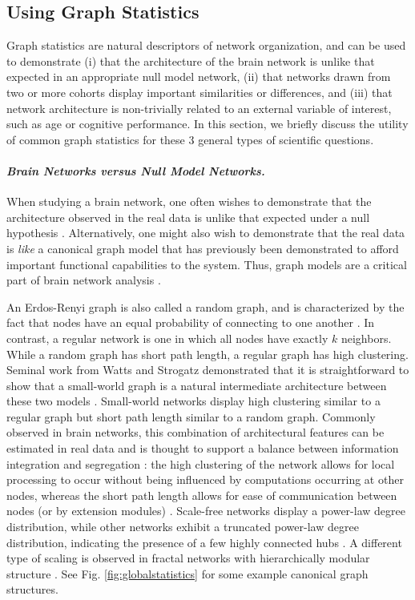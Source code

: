 \documentclass[12pt]{article}
\begin{document}
\subsection*{Using Graph Statistics}

Graph statistics are natural descriptors of network organization, and can be used to demonstrate (i) that the architecture of the brain network is unlike that expected in an appropriate null model network, (ii) that networks drawn from two or more cohorts display important similarities or differences, and (iii) that network architecture is non-trivially related to an external variable of interest, such as age or cognitive performance. In this section, we briefly discuss the utility of common graph statistics for these 3 general types of scientific questions.


\paragraph{\emph{Brain Networks \emph{versus} Null Model Networks.}}

When studying a brain network, one often wishes to demonstrate that the architecture observed in the real data is unlike that expected under a null hypothesis \cite{Bassett2011c,Bassett2012b}. Alternatively, one might also wish to demonstrate that the real data is \emph{like} a canonical graph model that has previously been demonstrated to afford important functional capabilities to the system. Thus, graph models are a critical part of brain network analysis \cite{Higham2008,Milenkovic2009,Rybarsch2012,Thorne2007,Kose2007}. 

An Erdos-Renyi graph is also called a random graph, and is characterized by the fact that nodes have an equal probability of connecting to one another \cite{Bollobas2001}. In contrast, a regular network is one in which all nodes have exactly $k$ neighbors. While a random graph has short path length, a regular graph has high clustering. Seminal work from Watts and Strogatz demonstrated that it is straightforward to show that a small-world graph is a natural intermediate architecture between these two models \cite{watts1998}. Small-world networks display high clustering similar to a regular graph but short path length similar to a random graph. Commonly observed in brain networks, this combination of architectural features can be estimated in real data \cite{muldoon2016small} and is thought to support a balance between information integration and segregation \cite{bassett2006small,bassett2016small}: the high clustering of the network allows for local processing to occur without being influenced by computations occurring at other nodes, whereas the short path length allows for ease of communication between nodes (or by extension modules) \cite{Stam2014}. Scale-free networks display a power-law degree distribution, while other networks exhibit a truncated power-law degree distribution, indicating the presence of a few highly connected hubs \cite{barabasi1999}. A different type of scaling is observed in fractal networks with hierarchically modular structure \cite{Sporns2006}. See Fig. \ref{fig:globalstatistics} for some example canonical graph structures.
\end{document}

